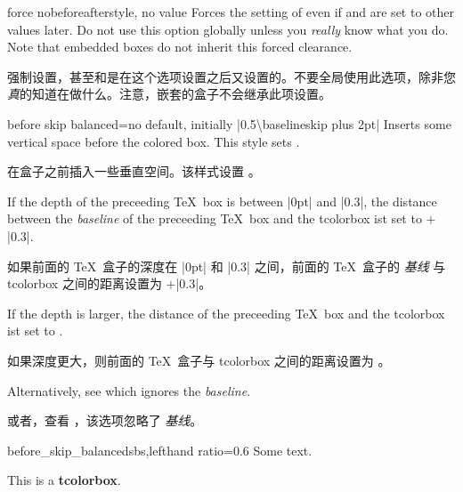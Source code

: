 \begin{docTcbKey}{force nobeforeafter}{}{style, no value}
Forces the setting of  even if
 and  are set to other values
later. Do not use this option globally unless you \emph{really} know what you do.
Note that embedded boxes do not inherit this forced clearance.

强制设置，甚至和是在这个选项设置之后又设置的。不要全局使用此选项，除非您\emph{真}的知道在做什么。注意，嵌套的盒子不会继承此项设置。
\end{docTcbKey}



\begin{docTcbKey}[][doc new={2020-09-25}]{before skip balanced}{=}{no default, initially |0.5\textbackslash baselineskip plus 2pt|}
Inserts some vertical space before the colored box. This style sets .\par
在盒子之前插入一些垂直空间。该样式设置 。\par
If the depth of the
preceeding \TeX\ box is between |0pt| and |0.3\baselineskip|,
the distance between the \emph{baseline} of the preceeding \TeX\ box and the tcolorbox
ist set to $+$|0.3\baselineskip|.\par
如果前面的 \TeX\ 盒子的深度在 |0pt| 和 |0.3\baselineskip| 之间，前面的 \TeX\ 盒子的 \emph{基线} 与 tcolorbox 之间的距离设置为 $+$|0.3\baselineskip|。\par
If the depth is larger, the distance of the preceeding \TeX\ box and the tcolorbox
ist set to .\par
如果深度更大，则前面的 \TeX\ 盒子与 tcolorbox 之间的距离设置为 。\par
Alternatively, see  which ignores the \emph{baseline}.

 或者，查看 ，该选项忽略了 \emph{基线}。

\begin{exdispExample*}{before_skip_balanced}{sbs,lefthand ratio=0.6}
Some text.
\begin{tcolorbox}[before skip balanced=1cm,
colframe=red!50!white]
This is a \textbf{tcolorbox}.
\end{tcolorbox}
\end{exdispExample*}
\end{docTcbKey}


